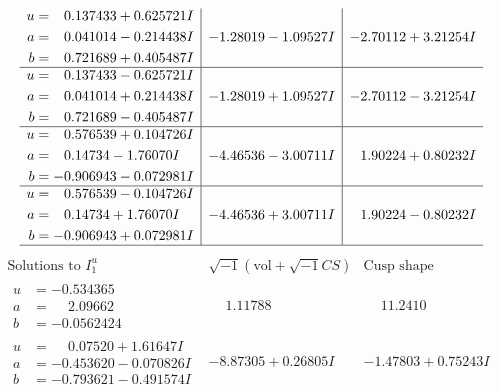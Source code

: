 \documentclass[1p]{elsarticle_modified}
\theoremstyle{definition}
\newcommand{\I}{\sqrt{-1}}
\begin{document}
$$\begin{array}{c|c|c}
\begin{aligned}
u &= \phantom{-}0.137433 + 0.625721 I \\
a &= \phantom{-}0.041014 - 0.214438 I \\
b &= \phantom{-}0.721689 + 0.405487 I\end{aligned}
 & -1.28019 - 1.09527 I & -2.70112 + 3.21254 I \\ \hline\begin{aligned}
u &= \phantom{-}0.137433 - 0.625721 I \\
a &= \phantom{-}0.041014 + 0.214438 I \\
b &= \phantom{-}0.721689 - 0.405487 I\end{aligned}
 & -1.28019 + 1.09527 I & -2.70112 - 3.21254 I \\ \hline\begin{aligned}
u &= \phantom{-}0.576539 + 0.104726 I \\
a &= \phantom{-}0.14734 - 1.76070 I \\
b &= -0.906943 - 0.072981 I\end{aligned}
 & -4.46536 - 3.00711 I & \phantom{-}1.90224 + 0.80232 I \\ \hline\begin{aligned}
u &= \phantom{-}0.576539 - 0.104726 I \\
a &= \phantom{-}0.14734 + 1.76070 I \\
b &= -0.906943 + 0.072981 I\end{aligned}
 & -4.46536 + 3.00711 I & \phantom{-}1.90224 - 0.80232 I\\
 \hline 
 \end{array}$$\newpage$$\begin{array}{c|c|c}  
\text{Solutions to }I^u_{1}& \I (\text{vol} + \sqrt{-1}CS) & \text{Cusp shape}\\
 \hline 
\begin{aligned}
u &= -0.534365\phantom{ +0.000000I} \\
a &= \phantom{-}2.09662\phantom{ +0.000000I} \\
b &= -0.0562424\phantom{ +0.000000I}\end{aligned}
 & \phantom{-}1.11788\phantom{ +0.000000I} & \phantom{-}11.2410\phantom{ +0.000000I} \\ \hline\begin{aligned}
u &= \phantom{-}0.07520 + 1.61647 I \\
a &= -0.453620 - 0.070826 I \\
b &= -0.793621 - 0.491574 I\end{aligned}
 & -8.87305 + 0.26805 I & -1.47803 + 0.75243 I \\ \hline\begin{aligned}

\end{aligned}
\end{array}$$
\end{document}
